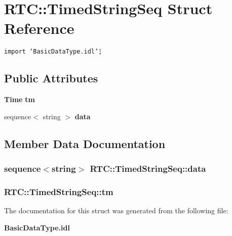 \section{RTC::Timed\-String\-Seq Struct Reference}
\label{structRTC_1_1TimedStringSeq}
{\tt import \char`\"{}Basic\-Data\-Type.idl\char`\"{};}

\subsection*{Public Attributes}
\begin{CompactItemize}
\item 
{\bf Time} {\bf tm}
\item 
sequence$<$ string $>$ {\bf data}
\end{CompactItemize}


\subsection{Member Data Documentation}
\subsubsection{\setlength{\rightskip}{0pt plus 5cm}sequence$<$string$>$ {\bf RTC::Timed\-String\-Seq::data}}\label{structRTC_1_1TimedStringSeq_RTC_1_1TimedStringSeqo1}


\subsubsection{ {\bf RTC::Timed\-String\-Seq::tm}}\label{structRTC_1_1TimedStringSeq_RTC_1_1TimedStringSeqo0}




The documentation for this struct was generated from the following file:\begin{CompactItemize}
\item 
{\bf Basic\-Data\-Type.idl}\end{CompactItemize}
